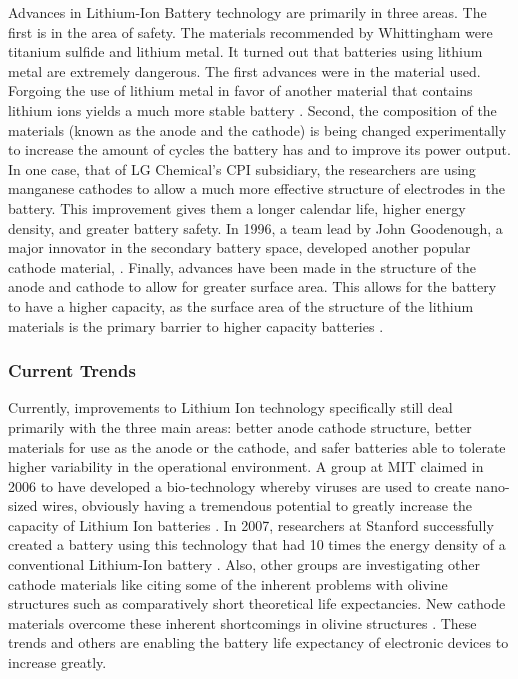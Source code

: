 \documentclass[12pt,oneside,letterpaper,titlepage]{article}
\begin{document}
Advances in Lithium-Ion Battery technology are primarily in three areas.  The
first is in the area of safety.  The materials recommended by Whittingham were
titanium sulfide and lithium metal.  It turned out that batteries using lithium
metal are extremely dangerous.  The first advances were in the material used.
Forgoing the use of lithium metal in favor of another material that contains
lithium ions yields a much more stable battery \citep{samar1981}.  Second, the
composition of the materials (known as the anode and the cathode) is being
changed experimentally to increase the amount of cycles the battery has and to
improve its power output.  In one case, that of LG Chemical's CPI subsidiary,
the researchers are using manganese cathodes to allow a much more effective
structure of electrodes in the battery.  This improvement gives them a longer
calendar life, higher energy density, and greater battery safety.  In 1996, a
team lead by John Goodenough, a major innovator in the secondary battery space,
developed another popular cathode material, .  Finally, advances have
been made in the structure of the anode and cathode to allow for greater surface
area.  This allows for the battery to have a higher capacity, as the surface
area of the structure of the lithium materials is the primary barrier to higher
capacity batteries \citep{idota1997}.

\subsubsection{Current Trends}

Currently, improvements to Lithium Ion technology specifically still deal
primarily with the three main areas: better anode cathode structure, better
materials for use as the anode or the cathode, and safer batteries able to
tolerate higher variability in the operational environment.  A group at MIT
claimed in 2006 to have developed a bio-technology whereby viruses are used to
create nano-sized wires, obviously having a tremendous potential to greatly
increase the capacity of Lithium Ion batteries \citep{nam2006}.  In 2007,
researchers at Stanford successfully created a battery using this technology
that had 10 times the energy density of a conventional Lithium-Ion battery
\citep{stanford2007}.  Also, other groups are investigating other cathode
materials like  citing some of the inherent problems with olivine
structures such as comparatively short theoretical life expectancies.  New
cathode materials overcome these inherent shortcomings in olivine structures
\citep{ellis2007}.  These trends and others are enabling the battery life
expectancy of electronic devices to increase greatly.
\end{document}
